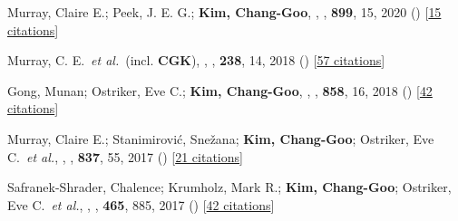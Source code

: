 \item[{39.}]Murray, Claire E.; Peek, J. E. G.; \textbf{Kim, Chang-Goo}, , \apj, \textbf{899}, 15, 2020 () [\href{http://adsabs.harvard.edu/abs/2020ApJ...899...15M}{15 citations}]

\item[{40.}]Murray, C. E.~\textit{et al.}~(incl. \textbf{CGK}), , \apjs, \textbf{238}, 14, 2018 () [\href{http://adsabs.harvard.edu/abs/2018ApJS..238...14M}{57 citations}]

\item[{41.}]Gong, Munan; Ostriker, Eve C.; \textbf{Kim, Chang-Goo}, , \apj, \textbf{858}, 16, 2018 () [\href{http://adsabs.harvard.edu/abs/2018ApJ...858...16G}{42 citations}]

\item[{42.}]Murray, Claire E.; Stanimirovi{\'c}, Sne{\v{z}}ana; \textbf{Kim, Chang-Goo}; Ostriker, Eve C.~\textit{et al.}, , \apj, \textbf{837}, 55, 2017 () [\href{http://adsabs.harvard.edu/abs/2017ApJ...837...55M}{21 citations}]

\item[{43.}]Safranek-Shrader, Chalence; Krumholz, Mark R.; \textbf{Kim, Chang-Goo}; Ostriker, Eve C.~\textit{et al.}, , \mnras, \textbf{465}, 885, 2017 () [\href{http://adsabs.harvard.edu/abs/2017MNRAS.465..885S}{42 citations}]